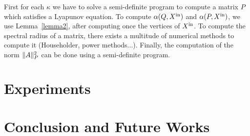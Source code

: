 \documentclass[10pt]{article}
\begin{document}
First for each $\kappa$ we have to solve a semi-definite program to compute a matrix $P$ which satisfies 
a Lyapunov equation.
To compute $\alpha(Q,X^\mathrm{in})$ and $\alpha(P,X^\mathrm{in})$, we use Lemma~\ref{lemma2}, after computing once the vertices of $X^\mathrm{in}$. 
To compute the spectral radius of a matrix, there exists a multitude of numerical methods to compute it (Householder, power methods...). Finally, the computation of the norm $\| A\|_P^2$ can be done using a semi-definite program.

\section{Experiments}

\section{Conclusion and Future Works} 


 
\end{document}

